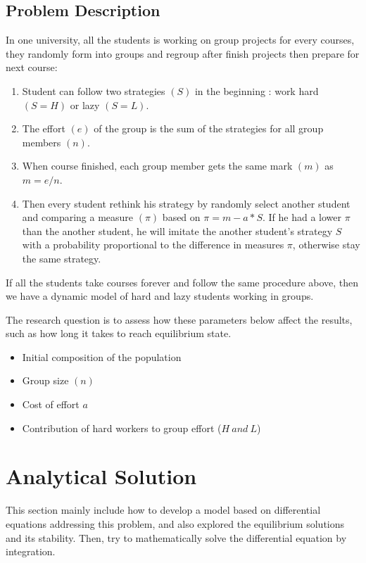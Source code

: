 \documentclass[a4paper, 12pt]{article}
\begin{document}
\subsection{Problem Description}
In one university, all the students is working on group projects for every courses, they randomly form into groups and regroup after finish projects then prepare for next course:
\begin{enumerate}[nolistsep]
	\item Student can follow two strategies $(S)$ in the beginning : work hard $(S = H)$ or lazy $(S = L)$.
	\item The effort $(e)$ of the group is the sum of the strategies for all group members $(n)$.
	\item When course finished, each group member gets the same mark $(m)$ as $m = e/n$.
	\item Then every student rethink his strategy by randomly select another student and comparing a measure $(\pi)$ based on $\pi = m - a*S$. If he had a lower $\pi$ than the another student, he will imitate the another student's strategy $S$ with a probability proportional to the difference in measures $\pi$, otherwise stay the same strategy.
\end{enumerate}
If all the students take courses forever and follow the same procedure above, then we have a dynamic model of hard and lazy students working in groups. 
\par The research question is to assess how these parameters below affect the results, such as how long it takes to reach equilibrium state.
\begin{itemize}[nolistsep]
	\item Initial composition of the population
	\item Group size $(n)$
	\item Cost of effort $a$
	\item Contribution of hard workers to group effort ($H\ and\ L$)
\end{itemize}

\section{Analytical Solution}
This section mainly include how to develop a model based on differential equations addressing this problem, and also explored the equilibrium solutions and its stability. Then, try to mathematically solve the differential equation by integration.
\end{document}
